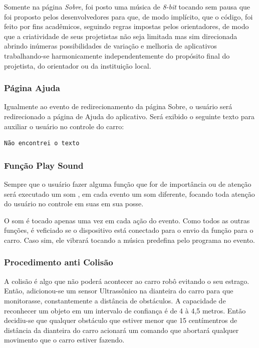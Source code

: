 \documentclass[portugues, brazil, a4paper,12pt]{article}
\begin{document}
Somente na página \textit{Sobre}, foi posto uma música de \textit{8-bit} tocando sem pausa que foi proposto pelos desenvolvedores para que, de modo implícito, que o código, foi feito por fins acadêmicos, seguindo regras impostas pelos orientadores, de modo que a criatividade de seus projetistas não seja limitada mas sim direcionada abrindo inúmeras possibilidades de variação e melhoria de aplicativos trabalhando-se harmonicamente independentemente do propósito final do projetista, do orientador ou da instituição local.

\subsubsection{Página Ajuda}
Igualmente ao evento de redirecionamento da página Sobre, o usuário será redirecionado a página de Ajuda do aplicativo. Será exibido o seguinte texto para auxiliar o usuário no controle do carro:

\begin{verbatim}
Não encontrei o texto
\end{verbatim}

\subsubsection{Função Play Sound}
Sempre que o usuário fazer alguma função que for de importância ou de atenção será executado um som , em cada evento um som diferente, focando toda atenção do usuário no controle em suas em sua posse.

O som é tocado apenas uma vez em cada ação do evento. Como todos as outras funções, é veficiado se o dispositivo está conectado para o envio da função para o carro. Caso sim, ele vibrará tocando a música predefina pelo programa no evento.

\subsubsection{Procedimento anti Colisão}
A colisão é algo que não poderá acontecer ao carro robô evitando o seu estrago. Então, adicionou-se um sensor Ultrassônico na dianteira do carro para que monitorasse, constantemente a distância de obstáculos. A capacidade de reconhecer um objeto em um intervalo de confiança é de 4 à 4,5 metros. Então decidiu-se que qualquer obstáculo que estiver menor que 15 centímentros de distância da dianteira do carro acionará um comando que abortará qualquer movimento que o carro estiver fazendo.
\end{document}
